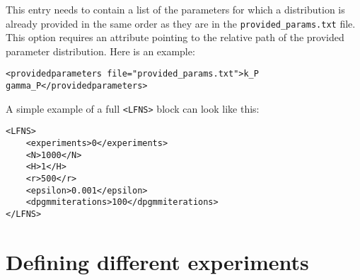 \documentclass[11pt]{article} %
\begin{document}
\begin{description}
This entry needs to contain a list of the parameters for which a distribution is already provided in the same order as they are in the \texttt{provided\_params.txt} file. This option requires an attribute pointing to the relative path of the provided parameter distribution. Here is an example: 
\begin{tcolorbox}
\begin{verbatim}
<providedparameters file="provided_params.txt">k_P gamma_P</providedparameters>
\end{verbatim}
\end{tcolorbox}
\end{description}
A simple example of a full \texttt{<LFNS>} block can look like this: 
\begin{tcolorbox}
\begin{verbatim}
<LFNS>
    <experiments>0</experiments>
    <N>1000</N>
    <H>1</H>
    <r>500</r>
    <epsilon>0.001</epsilon>
    <dpgmmiterations>100</dpgmmiterations>
</LFNS>
\end{verbatim}
\end{tcolorbox}

\section{Defining different experiments}
\end{document}
